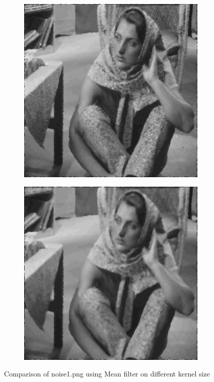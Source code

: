 \documentclass[12pt,a4paper]{report}
\begin{document}
\begin{figure}[!htb]
\begin{minipage}{\linewidth}
    \begin{subfigure}{0.49\textwidth}
      \includegraphics[width=\linewidth]{output/noise1_q2_K5P2.png}
    \end{subfigure}
    \begin{subfigure}{0.49\textwidth}
      \includegraphics[width=\linewidth]{output/noise1_q2_K7P3.png}
    \end{subfigure}

  \caption{Comparison of noise1.png using Mean filter on different kernel size}
  \end{minipage}

\end{figure}
\end{document}
